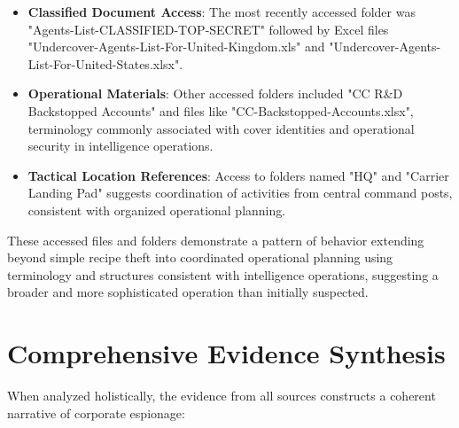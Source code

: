 \begin{itemize}
    \item \textbf{Classified Document Access}: The most recently accessed folder was "Agents-List-CLASSIFIED-TOP-SECRET" followed by Excel files "Undercover-Agents-List-For-United-Kingdom.xls" and "Undercover-Agents-List-For-United-States.xlsx".
    
    \item \textbf{Operational Materials}: Other accessed folders included "CC R\&D Backstopped Accounts" and files like "CC-Backstopped-Accounts.xlsx", terminology commonly associated with cover identities and operational security in intelligence operations.
    
    \item \textbf{Tactical Location References}: Access to folders named "HQ" and "Carrier Landing Pad" suggests coordination of activities from central command posts, consistent with organized operational planning.
\end{itemize}

These accessed files and folders demonstrate a pattern of behavior extending beyond simple recipe theft into coordinated operational planning using terminology and structures consistent with intelligence operations, suggesting a broader and more sophisticated operation than initially suspected.

\section{Comprehensive Evidence Synthesis}
When analyzed holistically, the evidence from all sources constructs a coherent narrative of corporate espionage:

